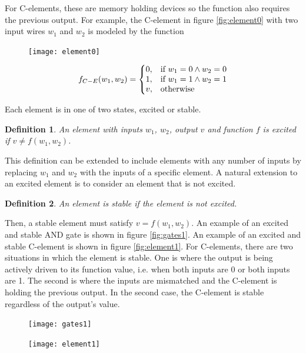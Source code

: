 \documentclass[12pt]{report}
\newtheorem*{definition}{Definition}
\begin{document}
For C-elements, these are memory holding devices so the function also requires the previous output.  For example, the C-element in figure \ref{fig:element0} with two input wires $w_1$ and $w_2$ is modeled by the function\\
\begin{figure}[h]
\centering
\texttt{[image: element0]}
\end{figure}
\[
f_{C-E}(w_1,w_2) =\left\{
  \begin{array}{@{}ll@{}}
    0, & \text{if}\ w_1=0 \wedge w_2=0\\
    1, & \text{if}\ w_1=1 \wedge w_2=1\\
    v, & \text{otherwise}

  \end{array}\right. 
\]

Each element is in one of two states, excited or stable.  
\begin{definition}
An element with inputs $w_1$, $w_2$, output $v$ and function $f$ is {\em excited} if $v\neq f(w_1,w_2)$.  
\end{definition}
This definition can be extended to include elements with any number of inputs by replacing $w_1$ and $w_2$ with the inputs of a specific element.  A natural extension to an excited element is to consider an element that is not excited.
\begin{definition} 
An element is stable if the element is not excited.
\end{definition}
Then, a stable element must satisfy $v= f(w_1,w_2)$.  An example of an excited and stable AND gate is shown in figure \ref{fig:gates1}.  An example of an excited and stable C-element is shown in figure \ref{fig:element1}.  For C-elements, there are two situations in which the element is stable.  One is where the output is being actively driven to its function value, i.e. when both inputs are 0 or both inputs are 1.  The second is where the inputs are mismatched and the C-element is holding the previous output.  In the second case, the C-element is stable regardless of the output's value.

\begin{figure}[h]
\centering
\texttt{[image: gates1]}
\end{figure}
\begin{figure}[h]
\centering
\texttt{[image: element1]}
\end{figure}
\end{document}
